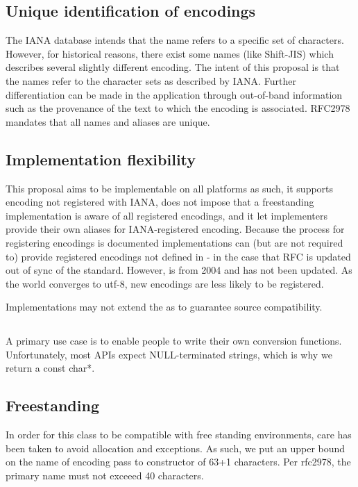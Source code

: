 \documentclass{wg21}
\begin{document}
\subsection{Unique identification of encodings}

The IANA database intends that the name refers to a specific set of characters.
However, for historical reasons, there exist some names (like Shift-JIS) which describes several slightly different encoding.
The intent of this proposal is that the names refer to the character sets as described by IANA.
Further differentiation can be made in the application through out-of-band information such as the provenance of the text to which the encoding is associated. RFC2978 mandates that all names and aliases are unique.

\subsection{Implementation flexibility}

This proposal aims to be implementable on all platforms as such, it supports encoding not registered with IANA, does not impose that
a freestanding implementation is aware of all registered encodings, and it let implementers provide their own aliases for IANA-registered encoding.
Because the process for registering encodings is documented \cite{rfc2978} implementations can (but are not required to) provide
registered encodings not defined in \cite{rfc3808} - in the case that RFC is updated out of sync of the standard.
However, \cite{rfc3808} is from 2004 and has not been updated. As the world converges to utf-8, new encodings are less likely to
be registered.

Implementations may not extend the  as to guarantee source compatibility.

\subsection{}

A primary use case is to enable people to write their own conversion functions.
Unfortunately, most APIs expect NULL-terminated strings, which is why we return a const char*.

\subsection{Freestanding}

In order for this class to be compatible with free standing environments, care has been taken to avoid
allocation and exceptions.
As such, we put an upper bound on the name of encoding pass to  constructor of 63+1 characters.
Per rfc2978, the primary name must not exceeed 40 characters.
\end{document}
